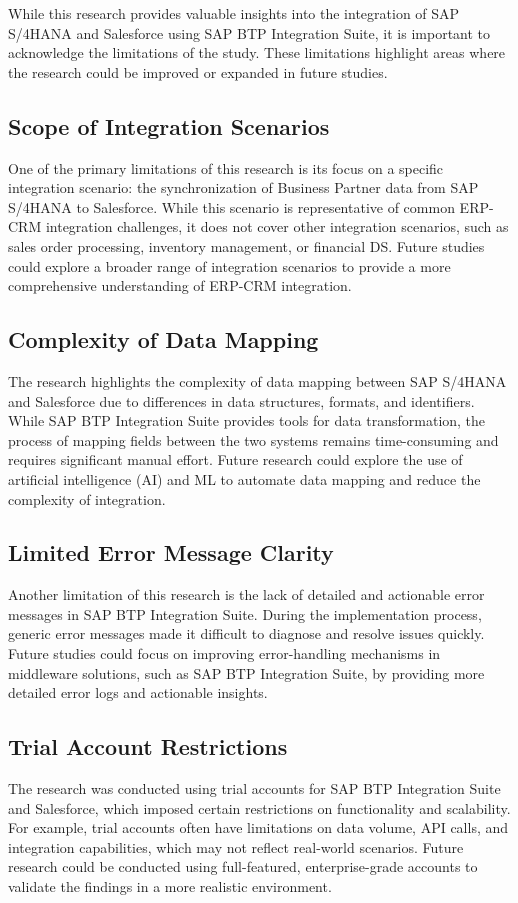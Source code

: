 While this research provides valuable insights into the integration of SAP S/4HANA and Salesforce using SAP BTP Integration Suite, it is important to acknowledge the limitations of the study. These limitations highlight areas where the research could be improved or expanded in future studies.

\subsection{Scope of Integration Scenarios}
One of the primary limitations of this research is its focus on a specific integration scenario: the synchronization of Business Partner data from SAP S/4HANA to Salesforce. While this scenario is representative of common ERP-CRM integration challenges, it does not cover other integration scenarios, such as sales order processing, inventory management, or financial DS. Future studies could explore a broader range of integration scenarios to provide a more comprehensive understanding of ERP-CRM integration.

\subsection{Complexity of Data Mapping}
The research highlights the complexity of data mapping between SAP S/4HANA and Salesforce due to differences in data structures, formats, and identifiers. While SAP BTP Integration Suite provides tools for data transformation, the process of mapping fields between the two systems remains time-consuming and requires significant manual effort. Future research could explore the use of artificial intelligence (AI) and ML to automate data mapping and reduce the complexity of integration.

\subsection{Limited Error Message Clarity}
Another limitation of this research is the lack of detailed and actionable error messages in SAP BTP Integration Suite. During the implementation process, generic error messages made it difficult to diagnose and resolve issues quickly. Future studies could focus on improving error-handling mechanisms in middleware solutions, such as SAP BTP Integration Suite, by providing more detailed error logs and actionable insights.

\subsection{Trial Account Restrictions}
The research was conducted using trial accounts for SAP BTP Integration Suite and Salesforce, which imposed certain restrictions on functionality and scalability. For example, trial accounts often have limitations on data volume, API calls, and integration capabilities, which may not reflect real-world scenarios. Future research could be conducted using full-featured, enterprise-grade accounts to validate the findings in a more realistic environment.

